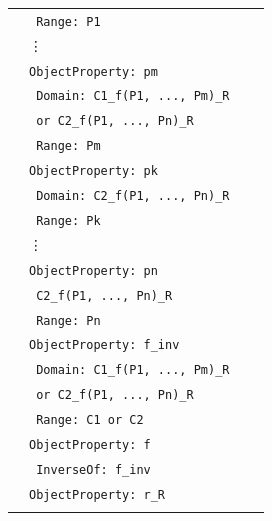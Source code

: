 \begin{longtable}{|>{\scriptsize}c|>{\scriptsize}l|>{\scriptsize}l|>{\scriptsize}p{0.8cm}|}
\begin{aligned}
          &\texttt{\hspace*{2mm} Range: P1}\\[\owlspacing]
          &\texttt{\hspace*{4mm}}\vdots \\[\owlspacing]
          &\texttt{ObjectProperty: pm}\\[\owlspacing]
          &\texttt{\hspace*{2mm} Domain: C1\_f(P1, ..., Pm)\_R} \\[\owlspacing]
          &\texttt{\hspace*{4mm} or C2\_f(P1, ..., Pn)\_R}\\[\owlspacing]
          &\texttt{\hspace*{2mm} Range: Pm}\\[\owlspacing]
          &\texttt{ObjectProperty: pk}\\[\owlspacing]
          &\texttt{\hspace*{2mm} Domain: C2\_f(P1, ..., Pn)\_R}\\[\owlspacing]
          &\texttt{\hspace*{2mm} Range: Pk}\\[\owlspacing]
          &\texttt{\hspace*{4mm}}\vdots \\[\owlspacing]
          &\texttt{ObjectProperty: pn}\\[\owlspacing]
          &\texttt{\hspace*{2mm} C2\_f(P1, ..., Pn)\_R}\\[\owlspacing]
          &\texttt{\hspace*{2mm} Range: Pn} \\[\owlspacing]       
          &\texttt{ObjectProperty: f\_inv}\\[\owlspacing]
          &\texttt{\hspace*{2mm} Domain: C1\_f(P1, ..., Pm)\_R} \\[\owlspacing]
          &\texttt{\hspace*{4mm} or C2\_f(P1, ..., Pn)\_R}\\[\owlspacing]
          &\texttt{\hspace*{2mm} Range: C1 or C2}\\[\owlspacing]
          &\texttt{ObjectProperty: f}\\[\owlspacing]
          &\texttt{\hspace*{2mm} InverseOf: f\_inv}\\[\owlspacing]  
          &\texttt{ObjectProperty: r\_R}\\[\owlspacing]

\end{aligned}
\end{longtable}
